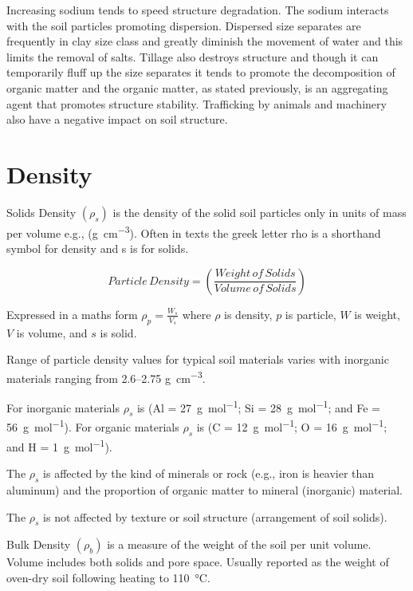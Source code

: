 \documentclass{article}
\begin{document}
Increasing sodium tends to speed structure degradation. The sodium interacts with the soil particles promoting dispersion. Dispersed size separates are frequently in clay size class and greatly diminish the movement of water and this limits the removal of salts. Tillage also destroys structure and though it can temporarily fluff up the size separates it tends to promote the decomposition of organic matter and the organic matter, as stated previously, is an aggregating agent that promotes structure stability. Trafficking by animals and machinery also have a negative impact on soil structure.
    
\section{Density}
\label{density}
    
Solids Density $\left(\rho_s\right)$ is the density of the solid soil particles only in units of mass per volume e.g., (\unit{\gram\per\cubic\centi\metre}). Often in texts the greek letter rho  is a shorthand symbol for density and s is for solids.

\begin{equation}
    Particle\,Density = \left(\frac{Weight\,of\,Solids}{Volume\,of\,Solids}\right)   
\end{equation}

Expressed in a maths form $\rho_p =\frac{W_s}{V_s}$ where $\rho$ is density, $p$ is particle, $W$ is weight, $V$ is volume, and $s$ is solid.

Range of particle density values for typical soil materials varies with inorganic materials ranging from \numrange{2.6}{2.75} \unit{\gram\per\cubic\centi\metre}.

For inorganic materials $\rho_s$ is  (Al = \qty[per-mode = symbol]{27}{\gram\per\mole}; Si =  \qty[per-mode = symbol]{28}{\gram\per\mole}; and Fe = \qty[per-mode = symbol]{56}{\gram\per\mole}). For organic materials $\rho_s$ is  (C = \qty[per-mode = symbol]{12}{\gram\per\mole}; O = \qty[per-mode = symbol]{16}{\gram\per\mole}; and H = \qty[per-mode = symbol]{1}{\gram\per\mole}).

The $\rho_s$ is affected by the kind of minerals or rock (e.g., iron is heavier than aluminum) and the proportion of organic matter to mineral (inorganic) material.

The $\rho_s$ is not affected by texture or soil structure (arrangement of soil solids).

Bulk Density $\left(\rho_b\right)$ is a measure of the weight of the soil per unit volume. Volume includes both solids and pore space. Usually reported as the weight of oven-dry soil following heating to \qty{110}{\degreeCelsius}.
\end{document}
